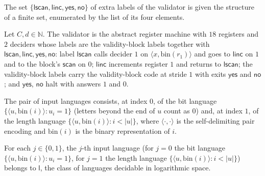 \begin{definition}
\label{Complexity.epadVXFintype}
\leanok
{}
The set $\{\mathsf{lscan}, \mathsf{linc}, \mathsf{yes}, \mathsf{no}\}$ of extra labels of the
validator is given the structure of a finite set, enumerated by the list of its four
elements.
\end{definition}

\begin{definition}
\label{Complexity.epadVA}
\leanok
{}
Let $C, d \in \mathbb{N}$. The validator is the abstract register machine with $18$ registers and
$2$ deciders whose labels are the validity-block labels together with
$\mathsf{lscan}, \mathsf{linc}, \mathsf{yes}, \mathsf{no}$: label $\mathsf{lscan}$ calls decider
$1$ on $\langle x, \mathrm{bin}(r_1)\rangle$ and goes to $\mathsf{linc}$ on $1$ and to the block's
$\mathsf{scan}$ on $0$; $\mathsf{linc}$ increments register $1$ and returns to $\mathsf{lscan}$; the
validity-block labels carry the validity-block code at stride $1$ with exits $\mathsf{yes}$ and
$\mathsf{no}$; and $\mathsf{yes}$, $\mathsf{no}$ halt with answers $1$ and $0$.
\end{definition}

\begin{definition}
\label{Complexity.epadIn}
\leanok
{}
The pair of input languages consists, at index $0$, of the bit language
$\{\langle u, \mathrm{bin}(i)\rangle : u_i = 1\}$ (letters beyond the end of $u$ count as $0$)
and, at index $1$, of the length language $\{\langle u, \mathrm{bin}(i)\rangle : i < |u|\}$, where
$\langle\cdot,\cdot\rangle$ is the self-delimiting pair encoding and $\mathrm{bin}(i)$ is the
binary representation of $i$.
\end{definition}

\begin{lemma}
\label{Complexity.epadIn_mem}
\leanok
{}
For each $j \in \{0,1\}$, the $j$-th input language (for $j = 0$ the bit language
$\{\langle u, \mathrm{bin}(i)\rangle : u_i = 1\}$, for $j = 1$ the length language
$\{\langle u, \mathrm{bin}(i)\rangle : i < |u|\}$) belongs to $\mathsf{l}$, the class of languages
decidable in logarithmic space.
\end{lemma}


